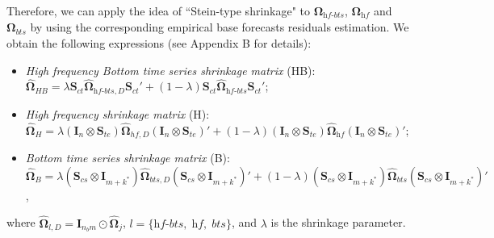 \documentclass[12pt]{article}
\newcommand{\Ivet}{\bm{I}}
\newcommand{\Svet}{\bm{S}}
\newcommand{\Omegavet}{\bm{\Omega}}
\theoremstyle{definition}
\begin{document}
Therefore, we can apply the idea of “Stein-type shrinkage" \citep{efron1977} to $\Omegavet_{\textit{hf-bts}}$, $\Omegavet_{\textit{hf}}$ and $\Omegavet_{\textit{bts}}$ by using the corresponding empirical base forecasts residuals estimation. We obtain the following expressions (see Appendix B for details):
\begin{itemize}[nosep]
	\item \textit{High frequency Bottom time series shrinkage matrix} (HB): \\ 
	$\widehat{\Omegavet}_{HB} = \lambda \Svet_{ct}\widehat{\Omegavet}_{\textit{hf-bts}, D}\Svet_{ct}'+ (1-\lambda) \Svet_{ct}\widehat{\Omegavet}_{\textit{hf-bts}}\Svet_{ct}'$;
	\item \textit{High frequency shrinkage matrix} (H): \\ $\widehat{\Omegavet}_{H}  = \lambda (\Ivet_{n} \otimes \Svet_{te})\widehat{\Omegavet}_{hf, D}(\Ivet_{n} \otimes \Svet_{te})' + (1-\lambda) (\Ivet_{n} \otimes \Svet_{te})\widehat{\Omegavet}_{\textit{hf}}(\Ivet_{n} \otimes \Svet_{te})'$;
	\item \textit{Bottom time series shrinkage matrix} (B): \\$\widehat{\Omegavet}_{B} = \lambda \left(\Svet_{cs} \otimes \Ivet_{m+k^\ast}\right)\widehat{\Omegavet}_{bts, D}\left(\Svet_{cs} \otimes \Ivet_{m+k^\ast}\right)' +  (1-\lambda) \left(\Svet_{cs} \otimes \Ivet_{m+k^\ast}\right)\widehat{\Omegavet}_{bts}\left(\Svet_{cs} \otimes \Ivet_{m+k^\ast}\right)'$,
\end{itemize}
where $\widehat{\Omegavet}_{l, D} = \Ivet_{n_b m}\odot\widehat{\Omegavet}_{j}$, $l = \{\textit{hf-bts}, \;\textit{hf}, \;\textit{bts}\}$, and $\lambda$ is the shrinkage parameter.
\end{document}
